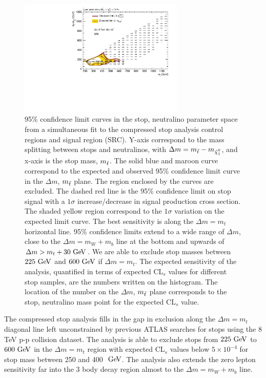 \begin{figure}[h!]
	\begin{center}
		\includegraphics[width=0.70\textwidth, angle=270]{HistFitterStuff/SRC_exclusion.pdf}
		\caption[95\% confidence limit curves in the stop, neutralino parameter space for the compressed stop analysis]{ 95\% confidence limit curves in the stop, neutralino parameter space from a simultaneous fit to the compressed stop analysis control regions and signal region (SRC).  Y-axis correspond to the mass splitting between stops and neutralinos, with $\Delta m = m_{\stop} - m_{\ninoone}$, and x-axis is the stop mass, $m_{\tilde{t}}$.  The solid blue and maroon curve correspond to the expected and observed 95\% confidence limit curve in the $\Delta m$, $m_{\tilde{t}}$ plane.  The region enclosed by the curves are excluded.  The dashed red line is the 95\% confidence limit on stop signal with a $1\sigma$ increase/decrease in signal production cross section.  The shaded yellow region correspond to the $1\sigma$ variation on the expected limit curve.  The best sensitivity is along the $\Delta m = m_t$ horizontal line.  95\% confidence limits extend to a wide range of $\Delta m$, close to the $\Delta m = m_W + m_b $ line at the bottom and upwards of $\Delta m > m_t+30 \gev $.  We are able to exclude stop masses between $225 \gev$ and $600 \gev$ if $\Delta m = m_t$.  The expected sensitivity of the analysis, quantified in terms of expected CL$_s$ values for different stop samples, are the numbers written on the histogram.  The location of the number on the $\Delta m$, $m_{\tilde{t}}$ plane corresponds to the stop, neutralino mass point for the expected CL$_s$ value.  }
		\label{figure.exclusion.SRC}
	\end{center}
\end{figure}

\indent  The compressed stop analysis fills in the gap in exclusion along the $\Delta m = m_{t}$ diagonal line left unconstrained by previous ATLAS searches for stops using the 8 TeV p-p collision dataset.  The analysis is able to exclude stops from $225 \gev$ to $600 \gev$ in the $\Delta m = m_{t}$ region with expected CL$_s$ values below $5\times 10^{-4}$ for stop mass between 250 and 400 $\gev$.  The analysis also extends the zero lepton sensitivity far into the 3 body decay region almost to the $\Delta m = m_{W}+m_{b}$ line. \\

